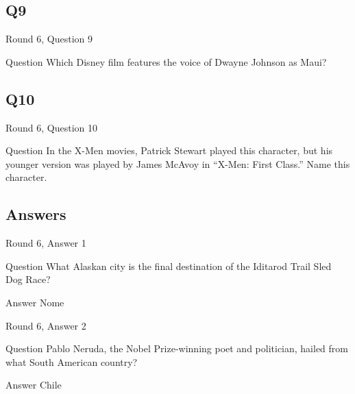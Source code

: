 \documentclass[11pt]{beamer}
\begin{document}
\subsection*{Q9}
\begin{frame}[t]{Round 6, Question 9}
\vspace{2em}
\begin{block}{Question}
Which Disney film features the voice of Dwayne Johnson as Maui\@?
\end{block}
\end{frame}
    

\subsection*{Q10}
\begin{frame}[t]{Round 6, Question 10}
\vspace{2em}
\begin{block}{Question}
In the X-Men movies, Patrick Stewart played this character, but his younger version was played by James McAvoy in ``X-Men: First Class.'' Name this character.
\end{block}
\end{frame}
    
\subsection{Answers}

\begin{frame}[t]{Round 6, Answer 1}
\vspace{2em}
\begin{block}{Question}
What Alaskan city is the final destination of the Iditarod Trail Sled Dog Race\@?
\end{block}
\pause{}
\begin{block}{Answer}
Nome
\end{block}
\end{frame}
    

\begin{frame}[t]{Round 6, Answer 2}
\vspace{2em}
\begin{block}{Question}
Pablo Neruda, the Nobel Prize-winning poet and politician, hailed from what South American country\@?
\end{block}
\pause{}
\begin{block}{Answer}
Chile
\end{block}
\end{frame}
    
\end{document}
